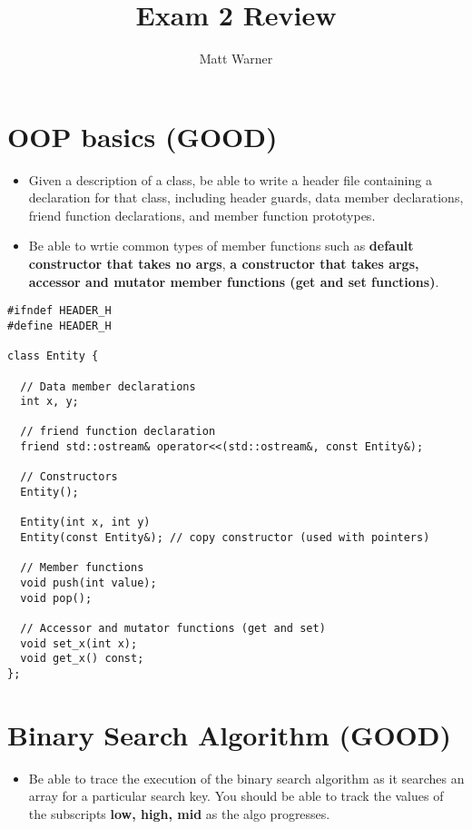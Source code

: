 \documentclass{report}
\title{\Huge{Exam 2 Review}}
\author{\huge{Matt Warner}}
\date{\huge{}}
\begin{document}
  \maketitle
  \section{OOP basics (GOOD)}
  \begin{itemize}
    \item Given a description of a class, be able to write a header file containing a declaration for that class, including header guards, data member declarations, friend function declarations, and member function prototypes. 
    \item Be able to wrtie common types of member functions such as \textbf{default constructor that takes no args}, \textbf{a constructor that takes args, accessor and mutator member functions (get and set functions)}.
  \end{itemize} 
  \begin{mdframed}
  \begin{verbatim}
#ifndef HEADER_H 
#define HEADER_H
  
class Entity {

  // Data member declarations
  int x, y; 

  // friend function declaration
  friend std::ostream& operator<<(std::ostream&, const Entity&); 

  // Constructors
  Entity();
  
  Entity(int x, int y)
  Entity(const Entity&); // copy constructor (used with pointers)

  // Member functions
  void push(int value);
  void pop();

  // Accessor and mutator functions (get and set)
  void set_x(int x);
  void get_x() const;
};
  \end{verbatim}
  \end{mdframed}
\begin{itemize}
\end{itemize}
\section{Binary Search Algorithm (GOOD)}
\begin{itemize}
  \item Be able to trace the execution of the binary search algorithm as it searches an array for a particular search key. You should be able to track the values of the subscripts \textbf{low, high, mid} as the algo progresses.
\end{itemize}
\end{document}
